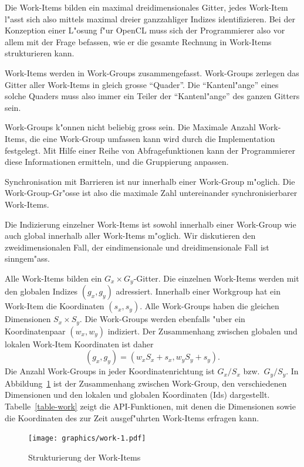 Die Work-Items bilden ein maximal dreidimensionales Gitter, jedes
Work-Item l"asst sich also mittels maximal dreier ganzzahliger 
Indizes identifizieren.
Bei der Konzeption einer L"osung f"ur OpenCL muss sich der
Programmierer also vor allem mit der Frage befassen, wie er die
gesamte Rechnung in Work-Items strukturieren kann. 

Work-Items werden in Work-Groups zusammengefasst.
Work-Groups zerlegen das Gitter aller Work-Items in gleich grosse ``Quader''.
Die ``Kantenl"ange'' eines solche Quaders muss also immer ein Teiler
der  ``Kantenl"ange'' des ganzen Gitters sein.

Work-Groups k"onnen nicht beliebig gross sein.
Die Maximale Anzahl Work-Items, die eine Work-Group umfassen kann
wird durch die Implementation festgelegt. 
Mit Hilfe einer Reihe von Abfragefunktionen kann der Programmierer
diese Informationen ermitteln, und die Gruppierung anpassen.

Synchronisation mit Barrieren ist nur innerhalb einer Work-Group
m"oglich.
Die Work-Group-Gr"osse ist also die maximale Zahl untereinander
synchronisierbarer Work-Items.

Die Indizierung einzelner Work-Items ist sowohl innerhalb einer
Work-Group wie auch global innerhalb aller Work-Items m"oglich.
Wir diskutieren den zweidimensionalen Fall, der eindimensionale und
dreidimensionale Fall ist sinngem"ass. 

Alle Work-Items bilden ein $G_x\times G_y$-Gitter. Die einzelnen
Work-Items werden mit den globalen Indizes $(g_x,g_y)$ adressiert.
Innerhalb einer Workgroup hat ein Work-Item die Koordinaten
$(s_x, s_y)$.
Alle Work-Groups haben die gleichen Dimensionen $S_x\times S_y$.
Die Work-Groups werden ebenfalls "uber ein Koordinatenpaar $(w_x,w_y)$
indiziert.
Der Zusammenhang zwischen globalen und lokalen Work-Item
Koordinaten ist daher
\[
(g_x, g_y)=(w_xS_x + s_x, w_yS_y+s_y).
\]
Die Anzahl Work-Groups in jeder Koordinatenrichtung ist $G_x/S_x$
bzw.~$G_y/S_y$.
In Abbildung~\ref{opencl-workitems} ist der Zusammenhang zwischen
Work-Group, den verschiedenen Dimensionen und den lokalen und globalen 
Koordinaten (Ids) dargestellt.
Tabelle~\ref{table-work} zeigt die API-Funktionen, mit denen
die Dimensionen sowie die Koordinaten des zur Zeit ausgef"uhrten
Work-Items erfragen kann.

\begin{figure}
\begin{center}
\texttt{[image: graphics/work-1.pdf]}
\end{center}
\caption{Strukturierung der Work-Items
\label{opencl-workitems}}
\end{figure}

